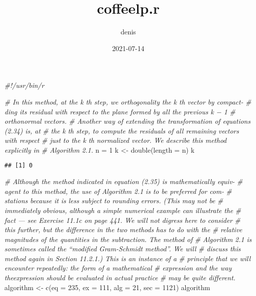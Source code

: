 \documentclass[
]{article}
\title{coffeelp.r}
\author{denis}
\date{2021-07-14}
\newenvironment{Shaded}{\begin{snugshade}}{\end{snugshade}}
\newcommand{\AttributeTok}[1]{\textcolor[rgb]{0.77,0.63,0.00}{#1}}
\newcommand{\CommentTok}[1]{\textcolor[rgb]{0.56,0.35,0.01}{\textit{#1}}}
\newcommand{\DecValTok}[1]{\textcolor[rgb]{0.00,0.00,0.81}{#1}}
\newcommand{\FunctionTok}[1]{\textcolor[rgb]{0.00,0.00,0.00}{#1}}
\newcommand{\NormalTok}[1]{#1}
\newcommand{\OtherTok}[1]{\textcolor[rgb]{0.56,0.35,0.01}{#1}}
\begin{document}
\maketitle

\begin{Shaded}
\begin{Highlighting}[]
\CommentTok{\#!/usr/bin/r}

\CommentTok{\# In this method, at the k th step, we orthogonality the k th vector by compact{-}}
\CommentTok{\# ding its residual with respect to the plane formed by all the previous k − 1}
\CommentTok{\# orthonormal vectors.}
\CommentTok{\# Another way of extending the transformation of equations (2.34) is, at}
\CommentTok{\# the k th step, to compute the residuals of all remaining vectors with respect}
\CommentTok{\# just to the k th normalized vector. We describe this method explicitly in}
\CommentTok{\# Algorithm 2.1.}
\NormalTok{n }\OtherTok{=} \DecValTok{1}
\NormalTok{k }\OtherTok{\textless{}{-}} \FunctionTok{double}\NormalTok{(}\AttributeTok{length =}\NormalTok{ n)}
\NormalTok{k}
\end{Highlighting}
\end{Shaded}

\begin{verbatim}
## [1] 0
\end{verbatim}

\begin{Shaded}
\begin{Highlighting}[]
\CommentTok{\# Although the method indicated in equation (2.35) is mathematically equiv{-}}
\CommentTok{\# agent to this method, the use of Algorithm 2.1 is to be preferred for com{-}}
\CommentTok{\# stations because it is less subject to rounding errors. (This may not be}
\CommentTok{\# immediately obvious, although a simple numerical example can illustrate the}
\CommentTok{\# fact — see Exercise 11.1c on page 441. We will not digress here to consider }
\CommentTok{\# this further, but the difference in the two methods has to do with the }
\CommentTok{\# relative magnitudes of the quantities in the subtraction. The method of }
\CommentTok{\# Algorithm 2.1 is sometimes called the “modified Gram{-}Schmidt method”. We will }
\CommentTok{\# discuss this method again in Section 11.2.1.) This is an instance of a }
\CommentTok{\# principle that we will encounter repeatedly: the form of a mathematical }
\CommentTok{\# expression and the way theexpression should be evaluated in actual practice }
\CommentTok{\# may be quite different.}
\NormalTok{algorithm }\OtherTok{\textless{}{-}} \FunctionTok{c}\NormalTok{(}\AttributeTok{eq =} \DecValTok{235}\NormalTok{, }\AttributeTok{ex =} \DecValTok{111}\NormalTok{, }\AttributeTok{alg =} \DecValTok{21}\NormalTok{, }\AttributeTok{sec =} \DecValTok{1121}\NormalTok{)}
\NormalTok{algorithm}
\end{Highlighting}
\end{Shaded}
\end{document}
